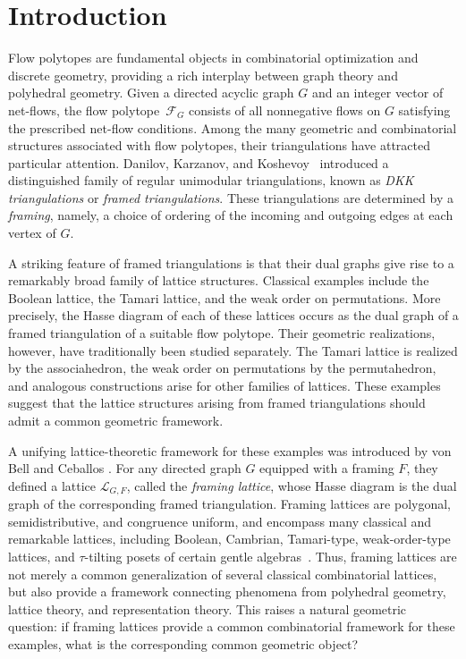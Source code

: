 \documentclass[12pt, reqno]{amsart}
\theoremstyle{plain}
\theoremstyle{definition}
\numberwithin{equation}{section}
\begin{document}
\section{Introduction}

Flow polytopes are fundamental objects in combinatorial optimization and discrete geometry, providing a rich interplay between graph theory and polyhedral geometry. Given a directed acyclic graph $G$ and an integer vector of net-flows, the flow polytope~$\mathcal{F}_G$ consists of all nonnegative flows on $G$ satisfying the prescribed net-flow conditions. Among the many geometric and combinatorial structures associated with flow polytopes, their triangulations have attracted particular attention. Danilov, Karzanov, and Koshevoy~\cite{dkktriangulation} introduced a distinguished family of regular unimodular triangulations, known as \emph{DKK triangulations} or \emph{framed triangulations}. These triangulations are determined by a \emph{framing}, namely, a choice of ordering of the incoming and outgoing edges at each vertex of $G$.

A striking feature of framed triangulations is that their dual graphs give rise to a remarkably broad family of lattice structures. Classical examples include the Boolean lattice, the Tamari lattice, and the weak order on permutations. More precisely, the Hasse diagram of each of these lattices occurs as the dual graph of a framed triangulation of a suitable flow polytope. Their geometric realizations, however, have traditionally been studied separately. The Tamari lattice is realized by the associahedron, the weak order on permutations by the permutahedron, and analogous constructions arise for other families of lattices. These examples suggest that the lattice structures arising from framed triangulations should admit a common geometric framework.

A unifying lattice-theoretic framework for these examples was introduced by von Bell and Ceballos \cite{vonBell_framing_2024}. For any directed graph $G$ equipped with a framing $F$, they defined a lattice $\mathscr{L}_{G,F}$, called the \emph{framing lattice}, whose Hasse diagram is the dual graph of the corresponding framed triangulation. Framing lattices are polygonal, semidistributive, and congruence uniform, and encompass many classical and remarkable lattices, including Boolean, Cambrian, Tamari-type, weak-order-type lattices, and $\tau$-tilting posets of certain gentle algebras~\cite{vonBell_framing_2024,BGMY23,BBBHPSY24,d2023realizing}. Thus, framing lattices are not merely a common generalization of several classical combinatorial lattices, but also provide a framework connecting phenomena from polyhedral geometry, lattice theory, and representation theory. This raises a natural geometric question: if framing lattices provide a common combinatorial framework for these examples, what is the corresponding common geometric object?
\end{document}
